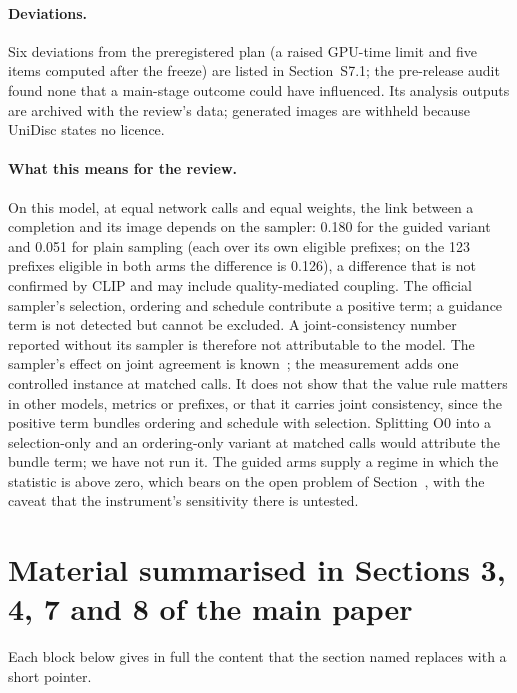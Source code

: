 \documentclass[acmsmall,screen]{acmart}
\makeatletter
\newcommand{\Mref}[1]{\@ifundefined{mr@#1}{\textbf{??}}{\csname mr@#1\endcsname}}
\makeatother
\begin{document}
\paragraph{Deviations.}
Six deviations from the preregistered plan (a raised GPU-time limit and five items computed after the freeze) are listed in Section~S7.1; the pre-release audit found none that a main-stage outcome could have influenced. Its analysis outputs are archived with the review's data; generated images are withheld because UniDisc states no licence.

\paragraph{What this means for the review.}
On this model, at equal network calls and equal weights, the link between a completion and its image depends on the sampler: 0.180 for the guided variant and 0.051 for plain sampling (each over its own eligible prefixes; on the 123 prefixes eligible in both arms the difference is 0.126), a difference that is not confirmed by CLIP and may include quality-mediated coupling. The official sampler's selection, ordering and schedule contribute a positive term; a guidance term is not detected but cannot be excluded. A joint-consistency number reported without its sampler is therefore not attributable to the model. The sampler's effect on joint agreement is known~\cite{arXiv:2607.13188,arXiv:2511.09611}; the measurement adds one controlled instance at matched calls. It does not show that the value rule matters in other models, metrics or prefixes, or that it carries joint consistency, since the positive term bundles ordering and schedule with selection. Splitting O0 into a selection-only and an ordering-only variant at matched calls would attribute the bundle term; we have not run it. The guided arms supply a regime in which the statistic is above zero, which bears on the open problem of Section~\Mref{sec:open-op3}, with the caveat that the instrument's sensitivity there is untested. %


\setcounter{section}{7}
\section{Material summarised in Sections 3, 4, 7 and 8 of the main paper}
\label{sec:s-moved}

Each block below gives in full the content that the section named replaces with a short pointer.
\end{document}
